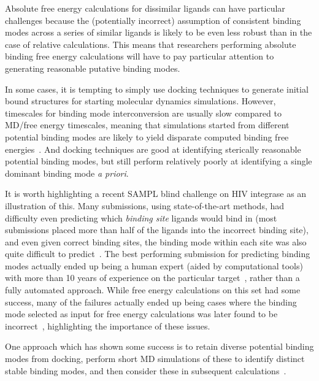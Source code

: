 \documentclass[9pt,bestpractices]{livecoms}
\begin{document}
Absolute free energy calculations for dissimilar ligands can have particular challenges because the (potentially incorrect) assumption of consistent binding modes across a series of similar ligands is likely to be even less robust than in the case of relative calculations.
This means that researchers performing absolute binding free energy calculations will have to pay particular attention to generating reasonable putative binding modes.

In some cases, it is tempting to simply use docking techniques to generate initial bound structures for starting molecular dynamics simulations.
However, timescales for binding mode interconversion are usually slow compared to MD/free energy timescales, meaning that simulations started from different potential binding modes are likely to yield disparate computed binding free energies~\cite{mobley2006use, palma2012computation, mobley2012perspective, gill2018binding}.
And docking techniques are good at identifying sterically reasonable potential binding modes, but still perform relatively poorly at identifying a single dominant binding mode \emph{a priori}. 


It is worth highlighting a recent SAMPL blind challenge on HIV integrase as an illustration of this. 
Many submissions, using state-of-the-art methods, had difficulty even predicting which \emph{binding site} ligands would bind in (most submissions placed more than half of the ligands into the incorrect binding site), and even given correct binding sites, the binding mode within each site was also quite difficult to predict~\cite{mobley2014blind}.
The best performing submission for predicting binding modes actually ended up being a human expert (aided by computational tools) with more than 10 years of experience on the particular target~\cite{voet2014combining}, rather than a fully automated approach.
While free energy calculations on this set had some success, many of the failures actually ended up being cases where the binding mode selected as input for free energy calculations was later found to be incorrect~\cite{gallicchio2014virtual}, highlighting the importance of these issues.

One approach which has shown some success is to retain diverse potential binding modes from docking, perform short MD simulations of these to identify distinct stable binding modes, and then consider these in subsequent calculations~\cite{gallicchio2014virtual, mobley2006use,rocklin2013blind, boyce2009predicting, mobley2007predicting}.
\end{document}
